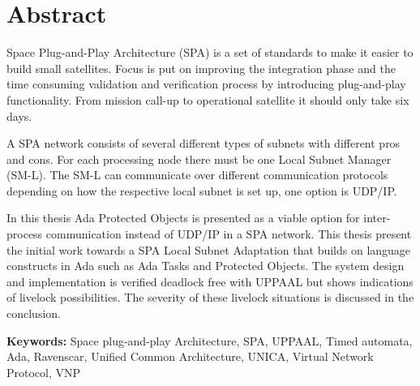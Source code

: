 \chapter*{Abstract}
\thispagestyle{empty} %
Space Plug-and-Play Architecture (SPA) is a set of standards to make it easier
to build small satellites. Focus is put on improving the integration phase and
the time consuming validation and verification process by introducing
plug-and-play functionality. From mission call-up to operational satellite it
should only take six days.

A SPA network consists of several different types of subnets with different
pros and cons. For each processing node there must be one Local Subnet Manager
(SM-L). The SM-L can communicate over different communication protocols
depending on how the respective local subnet is set up, one option is UDP/IP.

In this thesis Ada Protected Objects is presented as a viable option for
inter-process communication instead of UDP/IP in a SPA network. This thesis
present the initial work towards a SPA Local Subnet Adaptation that builds on
language constructs in Ada such as Ada Tasks and Protected Objects.  The system
design and implementation is verified deadlock free with UPPAAL but shows
indications of livelock possibilities. The severity of these livelock
situations is discussed in the conclusion.

\textbf{Keywords:} Space plug-and-play Architecture, SPA, UPPAAL, Timed
automata, Ada, Ravenscar, Unified Common Architecture, UNICA, Virtual Network
Protocol, VNP
